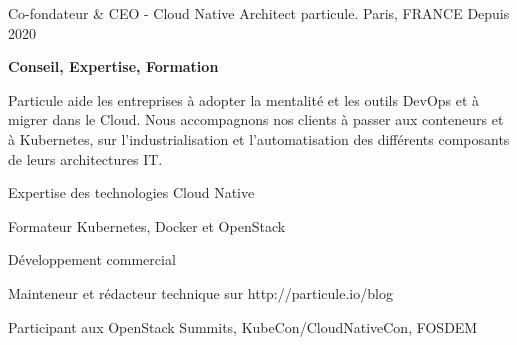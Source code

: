 

\begin{cventries}

\cventry
    {Co-fondateur \& CEO - Cloud Native Architect} %
    {particule.} %
    {Paris, FRANCE} %
    {Depuis 2020} %
    {
      \begin{cvitems} %
      \item {\textbf{Conseil, Expertise, Formation}}
      \item {Particule aide les entreprises à adopter la mentalité et les outils DevOps
        et à migrer dans le Cloud. Nous accompagnons nos clients à passer aux
          conteneurs et à Kubernetes, sur l'industrialisation et
          l'automatisation des différents composants de leurs architectures IT.}
        \item {Expertise des technologies Cloud Native}
        \item {Formateur Kubernetes, Docker et OpenStack}
        \item {Développement commercial}
        \item {Mainteneur et rédacteur technique sur http://particule.io/blog}
        \item {Participant aux OpenStack Summits, KubeCon/CloudNativeCon, FOSDEM}
      \end{cvitems}
    }


\end{cventries}
